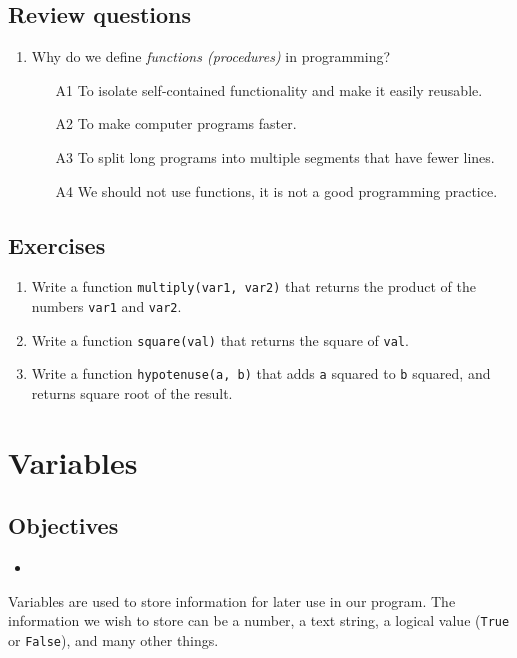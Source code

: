\documentclass[article,A4,12pt]{llncs}
\begin{document}
\subsection{Review questions}

\begin{enumerate}
\item Why do we define {\em functions (procedures)} in programming? 
\begin{enumerate}
\item[A1] To isolate self-contained functionality and make it easily reusable.
\item[A2] To make computer programs faster.
\item[A3] To split long programs into multiple segments that have fewer lines.
\item[A4] We should not use functions, it is not a good programming practice.
\end{enumerate}
\end{enumerate}

\subsection{Exercises}

\begin{enumerate}
\item Write a function {\tt multiply(var1, var2)} that returns the product of the 
      numbers {\tt var1} and {\tt var2}.
\item Write a function {\tt square(val)} that returns the square of {\tt val}.
\item Write a function {\tt hypotenuse(a, b)} that adds {\tt a} squared to {\tt b} squared,
      and returns square root of the result.
\end{enumerate}

\section{Variables}

\subsection{Objectives}

\begin{itemize}
\item
\end{itemize}


Variables are used to store information for later use in our program. The information
we wish to store can be a number, a text string, a logical value ({\tt True} or {\tt False}),
and many other things. 
\end{document}
